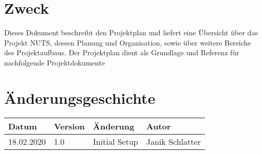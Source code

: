 \documentclass[
	ngerman,
	toc=listof, %
	toc=bibliography, %
	footnotes=multiple, %
	parskip=half, %
	numbers=noendperiod %
]{scrartcl}
\newcommand{\vorlagenOrdner}{../99_Vorlagen} %
\begin{document}
\thispagestyle{plain}

\cleardoublepage


\section*{Zweck}
Dieses Dokument beschreibt den Projektplan und liefert eine Übersicht über das Projekt NUTS, dessen Planung und Organisation, sowie über weitere Bereiche des Projektaufbaus. Der Projektplan dient als Grundlage und Referenz für nachfolgende Projektdokumente

\section*{Änderungsgeschichte}
\begin{tabularx}{0.9\textwidth}{llXl}
	\toprule
	Datum & Version & Änderung & Autor \\
	\midrule
	18.02.2020 & 1.0 & Initial Setup & Janik Schlatter \\
	\bottomrule
\end{tabularx}
\cleardoublepage

{}
\tableofcontents
\cleardoublepage

\let\stdsection\section
\renewcommand\section{\clearpage\stdsection}

\newpage

\end{document}
